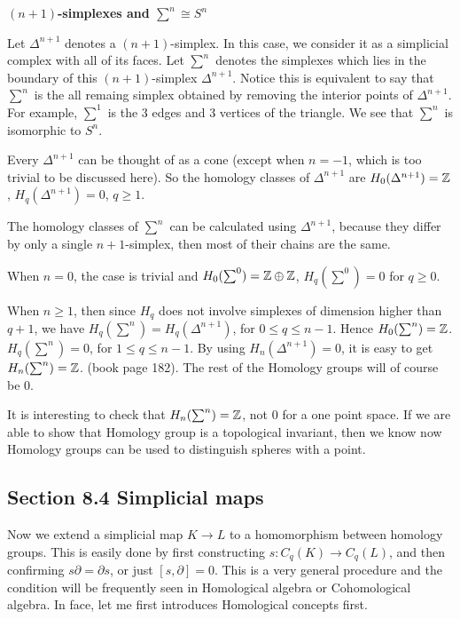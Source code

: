 \begin{ex}\textbf{$(n+1)$-simplexes and $\sum^n\cong S^n$}

    Let $\Delta^{n+1}$ denotes a $(n+1)$-simplex. In this case, we
    consider it as a simplicial complex with all of its faces. Let
    $\sum^n$ denotes the simplexes which lies in the boundary of this
    $(n+1)$-simplex $\Delta^{n+1}$. Notice this is equivalent to say
    that $\sum^n$ is the all remaing simplex obtained by removing the
    interior points of $\Delta^{n+1}$. For example, $\sum^1$ is the
    3 edges and 3 vertices of the triangle. We see that $\sum^n$ is
    isomorphic to $S^n$.

    Every $\Delta^{n+1}$ can be thought of as a cone (except when
    $n=-1$, which is too trivial to be discussed here). So the
    homology classes of $\Delta^{n+1}$ are $H_0(\Delta^{n+1})=\mathbb{Z}$,
    $H_q(\Delta^{n+1})=0$, $q\geq 1$.
    
    The homology classes of $\sum^n$ can be calculated using
    $\Delta^{n+1}$, because they differ by only a single
    ${n+1}$-simplex, then most of their chains are the same.

    When $n=0$, the case is trivial and $H_0(\sum^0)=\mathbb{Z}\oplus\mathbb{Z}$,
    $H_q(\sum^0)=0$ for $q\geq 0$.

    When $n\geq 1$, then since $H_q$ does not involve simplexes of
    dimension higher than $q+1$, we have
    $H_q(\sum^n)=H_q(\Delta^{n+1})$, for $0\leq q\leq n-1$. Hence
    $H_0(\sum^n)=\mathbb{Z}$. $H_q(\sum^n)=0$, for $1\leq q \leq n-1$. 
    By using $H_n(\Delta^{n+1})=0$, it is easy to get
    $H_n(\sum^n)=\mathbb{Z}$. (book\cite{book} page 182). The rest of the Homology groups
    will of course be $0$.

    It is interesting to check that $H_n(\sum^n)=\mathbb{Z}$, not $0$ for a
    one point space. If we are able to show that Homology group is a
    topological invariant, then we know now Homology groups can be
    used to distinguish spheres with a point.
\end{ex}


\subsection{Section 8.4 Simplicial maps}
\label{sec:Simplicial-maps}

Now we extend a simplicial map $K\to L$ to a homomorphism between
homology groups. This is easily done by first constructing
$s:C_q(K)\to C_q(L)$, and then confirming $s\partial=\partial s$, or
just $[s,\partial]=0$. This is a very general procedure and the
condition will be frequently seen in Homological algebra or
Cohomological algebra. In face, let me first introduces Homological
concepts first.

